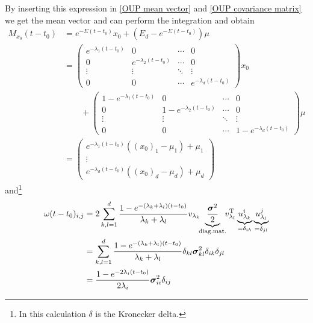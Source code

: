 \documentclass[11pt,titlepage]{article}
\theoremstyle{definition}
\theoremstyle{remark}
\begin{document}
	By inserting this expression in \ref{OUP mean vector} and \ref{OUP covariance matrix} we 
	get the mean vector and can perform the 
	integration and obtain
	\begin{align*}
		M_{x_0}(t-t_0) &= e^{-\Sigma (t-t_0)}x_0 +(E_d-e^{-\Sigma (t-t_0)})\mu \\
		&= \begin{pmatrix}
			e^{-\lambda_1 (t-t_0)} & 0 &\cdots & 0 \\
			0 & e^{-\lambda_2 (t-t_0)} & \cdots & 0 \\
			\vdots & \vdots & \ddots & \vdots \\
			0 & 0 & \cdots & e^{-\lambda_d (t-t_0)}
		\end{pmatrix}
		x_0 \\
		&\qquad+ \begin{pmatrix}
			1 - e^{-\lambda_1 (t-t_0)} & 0 &\cdots & 0 \\
			0 & 1 - e^{-\lambda_2 (t-t_0)} & \cdots & 0 \\
			\vdots & \vdots & \ddots & \vdots \\
			0 & 0 & \cdots & 1 - e^{-\lambda_d (t-t_0)}
		\end{pmatrix}
		\mu \\
		&= \begin{pmatrix}
			e^{-\lambda_1 (t-t_0)} ((x_0)_1 - \mu_1) + \mu_1 \\
			\vdots \\
			e^{-\lambda_d (t-t_0)} ((x_0)_d - \mu_d) + \mu_d
		\end{pmatrix}
	\end{align*}
	and\footnote{In this calculation $\delta$ is the Kronecker delta.}
	\begin{align*}
		\omega(t-t_0)_{i,j} &= 2 \sum_{k,l=1}^d \frac{1-e^{-(\lambda_k+\lambda_l)(t-t_0)}}{\lambda_k+\lambda_l}
		v_{\lambda_k}\hspace{-0.01\textwidth}\underbrace{\frac{\boldsymbol{\sigma}^2}{2}}_{\text{diag.mat.}}\hspace{-0.01\textwidth}v_{\lambda_l}^\text{T} \underbrace{u_{\lambda_k}^i}_{=\delta_{ik}} \underbrace{u_{\lambda_l}^j}_{=\delta_{jl}}\\
		&= \sum_{k,l=1}^d \frac{1-e^{-(\lambda_k+\lambda_l)(t-t_0)}}{\lambda_k+\lambda_l} 
		\delta_{kl} \boldsymbol{\sigma}^2_{kl} \delta_{ik}\delta_{jl}\\
		&= \frac{1- e^{-2\lambda_i (t-t_0)}}{2\lambda_i} \boldsymbol{\sigma}_{ii}^2 \delta_{ij}
	\end{align*}
\end{document}

